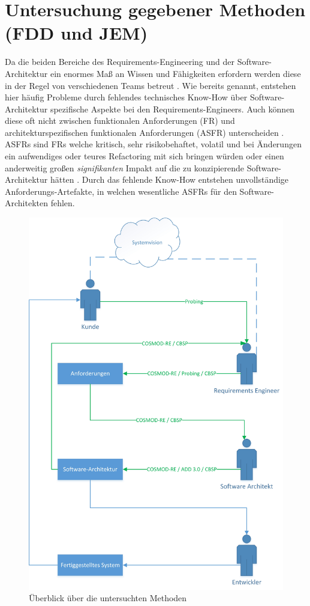 \section{Untersuchung gegebener Methoden (FDD und JEM)}

Da die beiden Bereiche des Requirements-Engineering und der Software-Architektur ein enormes Maß an Wissen und Fähigkeiten erfordern werden diese in der Regel von verschiedenen Teams betreut \cite{Ros02}. Wie bereits genannt, entstehen hier häufig Probleme durch fehlendes technisches Know-How über Software-Architektur spezifische Aspekte bei den Requirements-Engineers. Auch können diese oft nicht zwischen funktionalen Anforderungen (FR) und architekturspezifischen funktionalen Anforderungen (ASFR) unterscheiden \cite{Ros03}. ASFRs sind FRs welche kritisch, sehr risikobehaftet, volatil und bei Änderungen ein aufwendiges oder teures Refactoring mit sich bringen würden oder einen anderweitig großen \textit{signifikanten} Impakt auf die zu konzipierende Software-Architektur hätten \cite{Ros02}. Durch das fehlende Know-How entstehen unvollständige Anforderungs-Artefakte, in welchen wesentliche ASFRs für den Software-Architekten fehlen. \\

\begin{figure}[h]
	\centering
	\includegraphics[scale=0.5]{methoden.jpg} 
	\caption{Überblick über die untersuchten Methoden}\label{methoden}
\end{figure}


